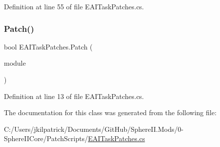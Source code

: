 Definition at line 55 of file E\+A\+I\+Task\+Patches.\+cs.

\mbox{\label{class_e_a_i_task_patches_a4ea2b64e82ea53f968647c054eaa79a1}} 
\subsubsection{\texorpdfstring{Patch()}{Patch()}}
{\footnotesize\ttfamily bool E\+A\+I\+Task\+Patches.\+Patch (\begin{DoxyParamCaption}\item[{Module\+Definition}]{module }\end{DoxyParamCaption})}



Definition at line 13 of file E\+A\+I\+Task\+Patches.\+cs.



The documentation for this class was generated from the following file\+:\begin{DoxyCompactItemize}
\item 
C\+:/\+Users/jkilpatrick/\+Documents/\+Git\+Hub/\+Sphere\+I\+I.\+Mods/0-\/\+Sphere\+I\+I\+Core/\+Patch\+Scripts/\mbox{\hyperlink{_e_a_i_task_patches_8cs}{E\+A\+I\+Task\+Patches.\+cs}}\end{DoxyCompactItemize}
